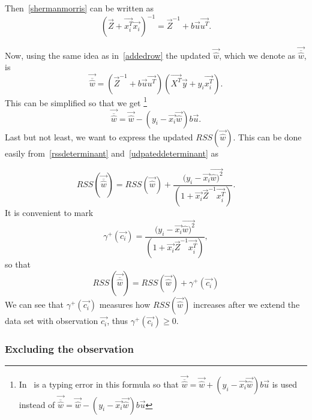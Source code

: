Then~\eqref{shermanmorris} can be written as
\begin{equation} \label{inversionplus}
    (\vec{Z} + \vec{x_i^T}\vec{x_i})^{-1} = \vec{Z}^{-1} + b\vec{u}\vec{u^T}.
\end{equation}

Now, using the same idea as in~\eqref{addedrow} the updated $\vec{\hat{w}}$, which we denote as $\vec{\overline{\hat{w}}}$, is 
\begin{equation}
    \vec{\overline{\hat{w}}} = (\vec{Z}^{-1} + b\vec{u}\vec{u^T})(\vec{X^T}\vec{y} + y_i\vec{x_i^T}).
\end{equation}
This can be simplified so that we get \footnote{In~\cite{agullo2001new} is a typing error in this formula so that $ \vec{\overline{\hat{w}}} = \vec{\hat{w}} + (y_i - \vec{x_i}\vec{\hat{w}})b\vec{u}$ is used instead of $ \vec{\overline{\hat{w}}} = \vec{\hat{w}} - (y_i - \vec{x_i}\vec{\hat{w}})b\vec{u}$}
\begin{equation} \label{thetaplus}
    \vec{\overline{\hat{w}}} = \vec{\hat{w}} - (y_i - \vec{x_i}\vec{\hat{w}})b\vec{u}.
\end{equation}
Last but not least, we want to express the updated $RSS(\vec{\hat{w}})$. This can be done easily from~\eqref{rssdeterminant} and~\eqref{udpateddeterminant} as 

\begin{equation}
    RSS(\vec{\overline{\hat{w}}}) =  RSS(\vec{\hat{w}}) + \dfrac{(y_i - \vec{x_i}\vec{\hat{w})^2}}{(1 + \vec{x_i}\vec{Z}^{-1}\vec{x_i^T})}.
\end{equation}
It is convenient to mark 
\begin{equation} \label{gamma:plus}
    \gamma^{+}(\vec{c_i}) = \dfrac{(y_i - \vec{x_i}\vec{\hat{w})^2}}{(1 + \vec{x_i}\vec{Z}^{-1}\vec{x_i^T})},
\end{equation}
so that 
\begin{equation} \label{rssplus}
    RSS(\vec{\overline{\hat{w}}}) =  RSS(\vec{\hat{w}}) + \gamma^{+}(\vec{c_i})
\end{equation}
We can see that $\gamma^{+}(\vec{c_i})$ measures how $RSS(\vec{\hat{w}})$ increases after we extend the data set with observation $\vec{c_i}$, thus $\gamma^{+}(\vec{c_i}) \geq 0$.




\subsubsection*{Excluding the observation}

